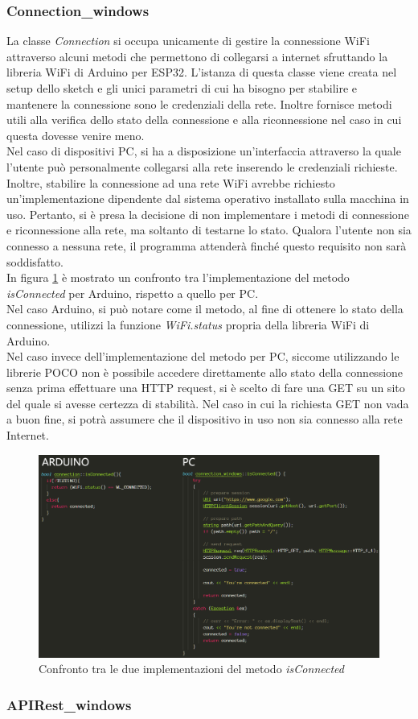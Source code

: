 \subsubsection{Connection\_windows}
La classe \textit{Connection} si occupa unicamente di gestire la connessione WiFi attraverso alcuni metodi che permettono di collegarsi a internet sfruttando la libreria WiFi di Arduino per ESP32. L'istanza di questa classe viene creata nel setup dello sketch e gli unici parametri di cui ha bisogno per stabilire e mantenere la connessione sono le credenziali della rete. Inoltre fornisce metodi utili alla verifica dello stato della connessione e alla riconnessione nel caso in cui questa dovesse venire meno.\\
Nel caso di dispositivi PC, si ha a disposizione un’interfaccia attraverso la quale l’utente può personalmente collegarsi alla rete inserendo le credenziali richieste. Inoltre, stabilire la connessione ad una rete WiFi avrebbe richiesto un’implementazione dipendente dal sistema operativo installato sulla macchina in uso. Pertanto, si è presa la decisione di non implementare i metodi di connessione e riconnessione alla rete, ma soltanto di testarne lo stato. Qualora l’utente non sia connesso a nessuna rete, il programma attenderà finché questo requisito non sarà soddisfatto.\\
In figura \ref{connAW} è mostrato un confronto tra l’implementazione del metodo \textit{isConnected} per Arduino, rispetto a quello per PC.\\
Nel caso Arduino, si può notare come il metodo, al fine di ottenere lo stato della connessione, utilizzi la funzione \textit{WiFi.status} propria della libreria WiFi di Arduino.\\
Nel caso invece dell'implementazione del metodo per PC, siccome utilizzando le librerie POCO non è possibile accedere direttamente allo stato della connessione senza prima effettuare una HTTP request, si è scelto di fare una GET su un sito del quale si avesse certezza di stabilità. Nel caso in cui la richiesta GET non vada a buon fine, si potrà assumere che il dispositivo in uso non sia connesso alla rete Internet.
\begin{figure}[H]
	\centering
	\includegraphics[width=\linewidth]{pics/connAW}
	\caption{Confronto tra le due implementazioni del metodo \textit{isConnected}}
	\label{connAW}
\end{figure}
\subsubsection{APIRest\_windows}

